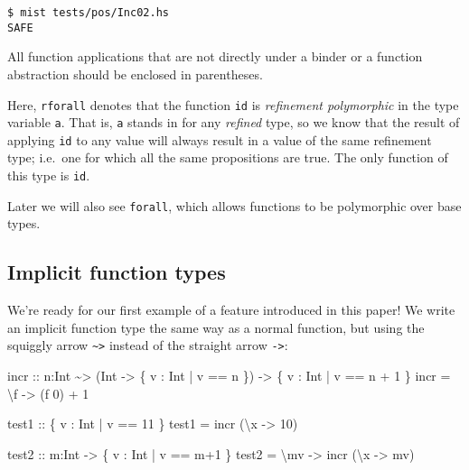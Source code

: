 \documentclass[
]{darts-v2021}
\newenvironment{Shaded}{}{}
\newcommand{\DataTypeTok}[1]{\textcolor[rgb]{0.56,0.13,0.00}{#1}}
\newcommand{\DecValTok}[1]{\textcolor[rgb]{0.25,0.63,0.44}{#1}}
\newcommand{\NormalTok}[1]{#1}
\newcommand{\OperatorTok}[1]{\textcolor[rgb]{0.40,0.40,0.40}{#1}}
\newcommand{\OtherTok}[1]{\textcolor[rgb]{0.00,0.44,0.13}{#1}}
\renewenvironment{quote}{\begin{myquote}}{\end{myquote}}
\begin{document}
\begin{verbatim}
$ mist tests/pos/Inc02.hs
SAFE
\end{verbatim}

\begin{quote}
All function applications that are not directly under a binder or a
function abstraction should be enclosed in parentheses.
\end{quote}

Here, \texttt{rforall} denotes that the function \texttt{id} is
\emph{refinement polymorphic} in the type variable \texttt{a}. That is,
\texttt{a} stands in for any \emph{refined} type, so we know that the
result of applying \texttt{id} to any value will always result in a
value of the same refinement type; i.e.~one for which all the same
propositions are true. The only function of this type is \texttt{id}.

Later we will also see \texttt{forall}, which allows functions to be
polymorphic over base types.

\hypertarget{implicit-function-types}{%
\subsection{Implicit function types}\label{implicit-function-types}}

We're ready for our first example of a feature introduced in this paper!
We write an implicit function type the same way as a normal function,
but using the squiggly arrow \texttt{\textasciitilde{}\textgreater{}}
instead of the straight arrow \texttt{-\textgreater{}}:

\begin{Shaded}
\begin{Highlighting}[numbers=left,,]
\OtherTok{incr ::}\NormalTok{ n}\OperatorTok{:}\DataTypeTok{Int} \OperatorTok{\textasciitilde{}\textgreater{}}\NormalTok{ (}\DataTypeTok{Int} \OtherTok{{-}\textgreater{}}\NormalTok{ \{ v }\OperatorTok{:} \DataTypeTok{Int} \OperatorTok{|}\NormalTok{ v }\OperatorTok{==}\NormalTok{ n \}) }\OtherTok{{-}\textgreater{}}\NormalTok{ \{ v }\OperatorTok{:} \DataTypeTok{Int} \OperatorTok{|}\NormalTok{ v }\OperatorTok{==}\NormalTok{ n }\OperatorTok{+} \DecValTok{1}\NormalTok{ \}}
\NormalTok{incr }\OtherTok{=}\NormalTok{ \textbackslash{}f }\OtherTok{{-}\textgreater{}}\NormalTok{ (f }\DecValTok{0}\NormalTok{) }\OperatorTok{+} \DecValTok{1}

\OtherTok{test1 ::}\NormalTok{ \{ v }\OperatorTok{:} \DataTypeTok{Int} \OperatorTok{|}\NormalTok{ v }\OperatorTok{==} \DecValTok{11}\NormalTok{ \}}
\NormalTok{test1 }\OtherTok{=}\NormalTok{ incr (\textbackslash{}x }\OtherTok{{-}\textgreater{}} \DecValTok{10}\NormalTok{)}

\OtherTok{test2 ::}\NormalTok{ m}\OperatorTok{:}\DataTypeTok{Int} \OtherTok{{-}\textgreater{}}\NormalTok{ \{ v }\OperatorTok{:} \DataTypeTok{Int} \OperatorTok{|}\NormalTok{ v }\OperatorTok{==}\NormalTok{ m}\OperatorTok{+}\DecValTok{1}\NormalTok{ \}}
\NormalTok{test2 }\OtherTok{=}\NormalTok{ \textbackslash{}mv }\OtherTok{{-}\textgreater{}}\NormalTok{ incr (\textbackslash{}x }\OtherTok{{-}\textgreater{}}\NormalTok{ mv)}
\end{Highlighting}
\end{Shaded}
\end{document}

